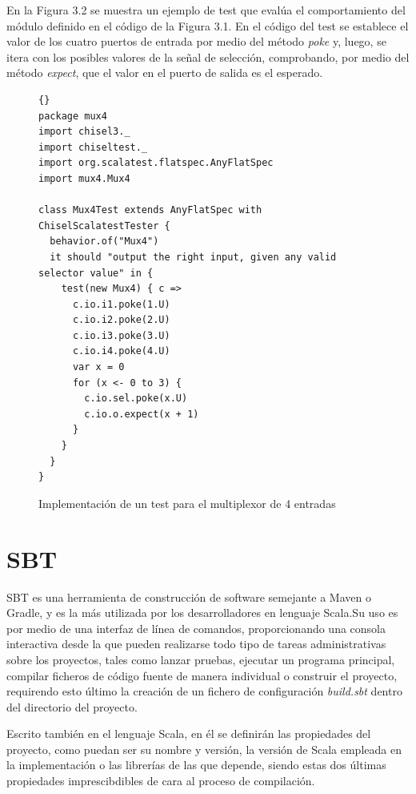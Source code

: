 En la Figura 3.2 se muestra un ejemplo de test que evalúa el comportamiento del módulo definido en el código de la Figura 3.1. En el código del test se establece el valor de los cuatro puertos de entrada por medio del método \textit{poke} y, luego, se itera con los posibles valores de la señal de selección, comprobando, por medio del método \textit{expect}, que el valor en el puerto de salida es el esperado.

\begin{figure}
\begin{lstlisting}[style=scalaStyle]{}
package mux4
import chisel3._
import chiseltest._
import org.scalatest.flatspec.AnyFlatSpec
import mux4.Mux4

class Mux4Test extends AnyFlatSpec with ChiselScalatestTester {
  behavior.of("Mux4")
  it should "output the right input, given any valid selector value" in {
    test(new Mux4) { c =>
      c.io.i1.poke(1.U)
      c.io.i2.poke(2.U)
      c.io.i3.poke(3.U)
      c.io.i4.poke(4.U)
      var x = 0
      for (x <- 0 to 3) {
        c.io.sel.poke(x.U)
        c.io.o.expect(x + 1)
      }
    }
  }
}
\end{lstlisting}
\vspace{-0.4cm}
\caption{Implementación de un test para el multiplexor de 4 entradas}
\end{figure}


\section{SBT}

SBT es una herramienta de construcción de software semejante a Maven o Gradle, y es la más utilizada por los desarrolladores en lenguaje Scala\cite{scalaSurvey}.Su uso es por medio de una interfaz de línea de comandos, proporcionando una consola interactiva desde la que pueden realizarse todo tipo de tareas administrativas sobre los proyectos, tales como lanzar pruebas, ejecutar un programa principal, compilar ficheros de código fuente de manera individual o construir el proyecto, requirendo esto último la creación de un fichero de configuración \textit{build.sbt} dentro del directorio del proyecto.

Escrito también en el lenguaje Scala, en él se definirán las propiedades del proyecto, como puedan ser su nombre y versión, la versión de Scala empleada en la implementación o las librerías de las que depende, siendo estas dos últimas propiedades imprescibdibles de cara al proceso de compilación.

